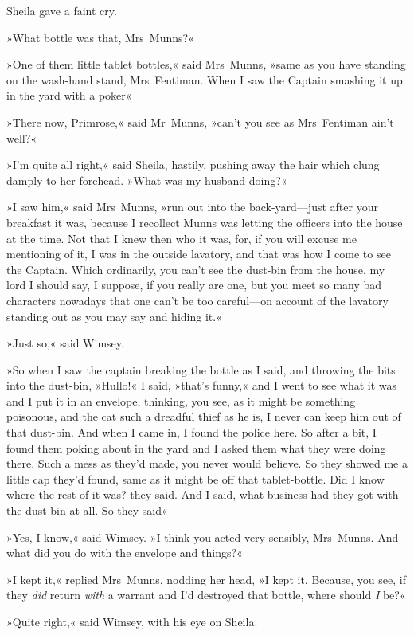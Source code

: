 Sheila gave a faint cry.

»What bottle was that, Mrs~Munns?«

»One of them little tablet bottles,« said Mrs~Munns, »same as you have standing on the wash-hand stand, Mrs~Fentiman. When I saw the Captain smashing it up in the yard with a poker\longdash«

»There now, Primrose,« said Mr~Munns, »can't you see as Mrs~Fentiman ain't well?«

»I'm quite all right,« said Sheila, hastily, pushing away the hair which clung damply to her forehead. »What was my husband doing?«

»I saw him,« said Mrs~Munns, »run out into the back-yard—just after your breakfast it was, because I recollect Munns was letting the officers into the house at the time. Not that I knew then who it was, for, if you will excuse me mentioning of it, I was in the outside lavatory, and that was how I come to see the Captain. Which ordinarily, you can't see the dust-bin from the house, my lord I should say, I suppose, if you really are one, but you meet so many bad characters nowadays that one can't be too careful—on account of the lavatory standing out as you may say and hiding it.«

»Just so,« said Wimsey.

»So when I saw the captain breaking the bottle as I said, and throwing the bits into the dust-bin, »Hullo!« I said, »that's funny,« and I went to see what it was and I put it in an envelope, thinking, you see, as it might be something poisonous, and the cat such a dreadful thief as he is, I never can keep him out of that dust-bin. And when I came in, I found the police here. So after a bit, I found them poking about in the yard and I asked them what they were doing there. Such a mess as they'd made, you never would believe. So they showed me a little cap they'd found, same as it might be off that tablet-bottle. Did I know where the rest of it was? they said. And I said, what business had they got with the dust-bin at all. So they said\longdash«

»Yes, I know,« said Wimsey. »I think you acted very sensibly, Mrs~Munns. And what did you do with the envelope and things?«

»I kept it,« replied Mrs~Munns, nodding her head, »I kept it. Because, you see, if they \textit{did} return \textit{with} a warrant and I'd destroyed that bottle, where should \textit{I} be?«

»Quite right,« said Wimsey, with his eye on Sheila.

